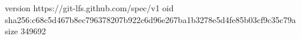version https://git-lfs.github.com/spec/v1
oid sha256:c68c5d467b8ec796378207b922c6d96e267ba1b3278e5d4fe85b03cf9c35c79a
size 349692
